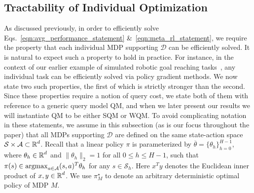 \documentclass[11pt,twoside]{article}
\begin{document}
\subsection{Tractability of Individual Optimization}
\label{sec:optcond}
As discussed previously, in order to efficiently solve Eqs.~\eqref{eqn:avg_performance_statement} \&~\eqref{eqn:meta_rl_statement}, we require the property that each individual MDP supporting $\mathcal{D}$ can be efficiently solved. It is natural to expect such a property to hold in practice. For instance, in the context of our earlier example of simulated robotic goal reaching tasks~\citep{yu19}, any individual task can be efficiently solved via policy gradient methods. We now state two such properties, the first of which is strictly stronger than the second. Since these properties require a notion of query cost, we state both of them with reference to a generic query model QM, and when we later present our results we will instantiate QM to be either SQM or WQM. To avoid complicating notation in these statements, we assume in this subsection (as is our focus throughout the paper) that all MDPs supporting $\mathcal{D}$ are defined on the same state-action space $\mathcal{S} \times \mathcal{A} \subset \operatorname{\mathbb{R}}^d$. Recall that a linear policy $\pi$ is parameterized by $\overline{\theta} = \{ \theta_h \}_{h=0}^{H-1}$, where $\theta_h \in \operatorname{\mathbb{R}}^d$ and $\| \theta_h \|_2 = 1$ for all $0 \leq h \leq H-1$, such that $\pi(s) \in \operatorname*{argmax}_{a \in \mathcal{A}} (s, a)^T \theta_h$ for any $s \in \mathcal{S}_h$. Here $x^Ty$ denotes the Euclidean inner product of $x,y \in \operatorname{\mathbb{R}}^d$. We use $\pi_M^\star$ to denote an arbitrary deterministic optimal policy of MDP $M$. 


\end{document}
